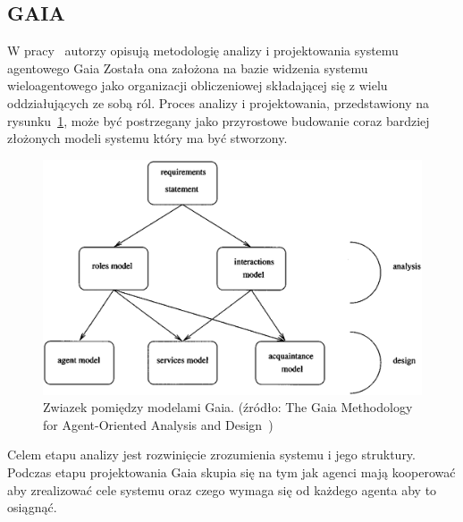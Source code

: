 \documentclass[11pt]{report}
\begin{document}
    \subsection{GAIA}
    W pracy~\cite{Wooldridge2000a} autorzy opisują metodologię analizy i projektowania systemu agentowego Gaia
    Została ona założona na bazie widzenia systemu wieloagentowego jako organizacji obliczeniowej składającej się z wielu oddziałujących ze sobą ról.
    Proces analizy i projektowania, przedstawiony na rysunku~\ref{fig:gaia}, może być postrzegany jako przyrostowe budowanie coraz bardziej złożonych modeli systemu który ma być stworzony.
    \begin{figure}[!ht]
        \centering
        \includegraphics[width=\linewidth]{fig/gaia models.png}
        \caption{Zwiazek pomiędzy modelami Gaia. (źródło: The Gaia Methodology for Agent-Oriented Analysis and Design~\cite{Wooldridge2000a})}
        \label{fig:gaia}
    \end{figure}
    Celem etapu analizy jest rozwinięcie zrozumienia systemu i jego struktury.
    Podczas etapu projektowania Gaia skupia się na tym jak agenci mają kooperować aby zrealizować cele systemu oraz czego wymaga się od każdego agenta aby to osiągnąć.
\end{document}

